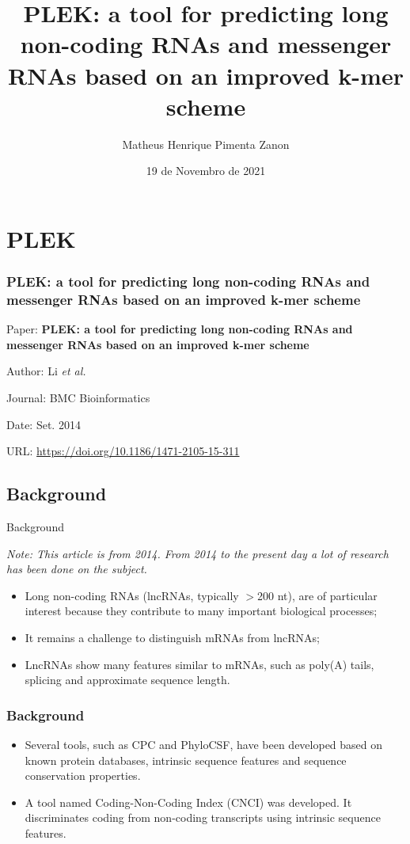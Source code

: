 \documentclass[hyperref={pdfpagelabels=false}]{beamer}
\title{PLEK: a tool for predicting long non-coding RNAs and messenger RNAs based on an improved k-mer scheme}
\author[Matheus Pimenta]{Matheus Henrique Pimenta Zanon}
\institute[UTFPR-CP]{\normalsize Universidade Tecnológica Federal do Paraná \\
	Câmpus Cornélio Procópio
}
\date{19 de Novembro de 2021}
\begin{document}
	
\begin{frame}
\titlepage
\end{frame} 


\section{PLEK} 
\begin{frame}
\frametitle{PLEK: a tool for predicting long non-coding RNAs and messenger RNAs based on an improved k-mer scheme} 
Paper: \textbf{PLEK: a tool for predicting long non-coding RNAs and messenger RNAs based on an improved k-mer scheme}

Author: Li \textit{et al.}

Journal: BMC Bioinformatics

Date: Set. 2014

URL: \url{https://doi.org/10.1186/1471-2105-15-311}

\end{frame}

\subsection{Background}
\begin{frame}{Background}
\begin{center}
 \textit{Note: This article is from 2014. From 2014 to the present day a lot of research has been done on the subject.}\pause
\end{center}
\begin{itemize}
 \item  Long non-coding RNAs (lncRNAs, typically $>$200 nt), are of particular interest because they contribute to many important biological processes;\pause
 \item It remains a challenge to distinguish mRNAs from lncRNAs;\pause
 \item LncRNAs show many features similar to mRNAs, such as poly(A) tails, splicing and approximate sequence length.
\end{itemize}
\end{frame}

\begin{frame}
\frametitle{Background}
\begin{itemize}
 \item Several tools, such as CPC and PhyloCSF, have been developed based on known protein databases, intrinsic sequence features and sequence conservation properties.\pause
 \item A tool named Coding-Non-Coding Index (CNCI) was developed. It discriminates coding from non-coding transcripts using intrinsic sequence features.
\end{itemize}

\end{frame}
\end{document}

